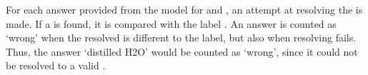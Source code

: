 For each answer provided from the model for \tadd and \tsolv, an attempt at resolving the \cid is made.
If a \cid is found, it is compared with the label \cid.
An answer is counted as `wrong' when the resolved \cid is different to the label, but also when resolving fails.
Thus, the answer `distilled H2O' would be counted as `wrong', since it could not be resolved to a valid \cid.



